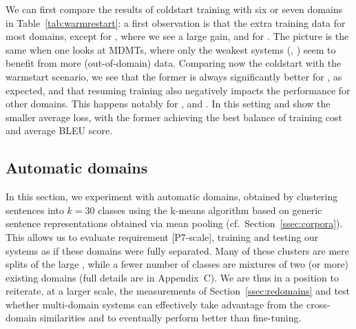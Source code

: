 We can first compare the results of coldstart training with six or seven domains in Table~\ref{tab:warmrestart}: a first observation is that the extra training data  for most domains, except for , where we see a large gain, and for . The picture is the same when one looks at MDMTs, where only the weakest systems (, ) seem to benefit from more (out-of-domain) data.
Comparing now the coldstart with the warmstart scenario, we see that the former is always significantly better for , as expected, and that resuming training also negatively impacts the performance for other domains. This happens notably for ,  and . In this setting  and  show the smaller average loss, with the former achieving the best balance of training cost and average BLEU score.

\subsection{Automatic domains \label{ssec:autodomains}}
In this section, we experiment with automatic domains, obtained by clustering sentences into $k=30$ classes using the k-means algorithm based on generic sentence representations obtained via mean pooling (cf.\ Section~\ref{ssec:corpora}). This allows us to evaluate requirement [P7-scale], training and testing our systems as if these domains were fully separated. Many of these clusters are mere splits of the large , while a fewer number of classes are mixtures of two (or more) existing domains (full details are in Appendix~C). We are thus in a position to reiterate, at a larger scale, the measurements of Section~\ref{ssec:redomains} and test whether multi-domain systems can effectively take advantage from the cross-domain similarities and to eventually perform better than fine-tuning. 

